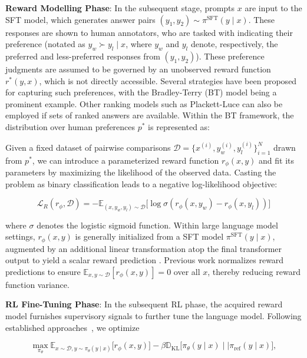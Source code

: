 \textbf{Reward Modelling Phase}: In the subsequent stage, prompts $x$ are input to the SFT model, which generates answer pairs $(y_1, y_2)\sim \pi^\text{SFT}(y \mid x)$. These responses are shown to human annotators, who are tasked with indicating their preference (notated as $y_w\succ y_l \mid x$, where $y_w$ and $y_l$ denote, respectively, the preferred and less-preferred responses from $(y_1, y_2)$). These preference judgments are assumed to be governed by an unobserved reward function $r^*(y, x)$, which is not directly accessible. Several strategies have been proposed for capturing such preferences, with the Bradley-Terry (BT) model \cite{bradley1952rankanalysis} being a prominent example. Other ranking models such as Plackett-Luce \citep{plackett1975analysis, luce2012individual} can also be employed if sets of ranked answers are available. Within the BT framework, the distribution over human preferences $p^*$ is represented as:

Given a fixed dataset of pairwise comparisons $\mathcal{D}=\bigl\{x^{(i)}, y_w^{(i)}, y_l^{(i)}\bigr\}_{i=1}^N$ drawn from $p^*$, we can introduce a parameterized reward function $r_{\phi}(x, y)$ and fit its parameters by maximizing the likelihood of the observed data. Casting the problem as binary classification leads to a negative log-likelihood objective:

\begin{equation}\label{eq:reward_model}
    \mathcal{L}_R(r_{\phi}, \mathcal{D}) = -\mathbb{E}_{(x, y_w, y_l)\sim \mathcal{D}}\bigl[\log \sigma(r_{\phi}(x, y_w)- r_{\phi}(x, y_l))\bigr]
\end{equation}

where $\sigma$ denotes the logistic sigmoid function. Within large language model settings, $r_{\phi}(x, y)$ is generally initialized from a SFT model $\pi^\text{SFT}(y \mid x)$, augmented by an additional linear transformation atop the final transformer output to yield a scalar reward prediction \cite{ziegler2020finetuning}. Previous work normalizes reward predictions to ensure $\mathbb{E}_{x,y\sim \mathcal{D}}\left[r_\phi(x, y)\right] = 0$ over all $x$, thereby reducing reward function variance.

\textbf{RL Fine-Tuning Phase}: In the subsequent RL phase, the acquired reward model furnishes supervisory signals to further tune the language model. Following established approaches~\citep{jaques2017sequence, jaques2020human}, we optimize

\begin{equation}\label{eq:RL}
\max_{\pi_{\theta}}  \mathbb{E}_{x\sim \mathcal{D}, y\sim \pi_{\theta}(y \mid x)}\bigl[r_{\phi}(x, y)\bigr] - \beta\mathbb{D}_{\textrm{KL}}\bigl[\pi_{\theta}(y\mid x)\mid \mid \pi_\text{ref}(y\mid x)\bigr],
\end{equation}

